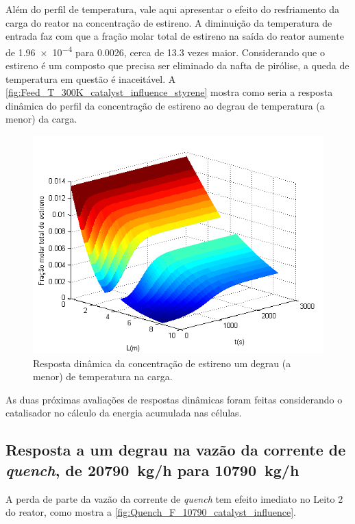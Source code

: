 Além do perfil de temperatura, vale aqui apresentar o efeito do resfriamento da
carga do reator na concentração de estireno. A diminuição da temperatura de
entrada faz com que a fração molar total de estireno na saída do reator aumente
de \num{1,96e-4} para \num{0,0026}, cerca de \num{13,3} vezes maior.
Considerando que o estireno é um composto que precisa ser eliminado da nafta de
pirólise, a queda de temperatura em questão é inaceitável. A
\autoref{fig:Feed_T_300K_catalyst_influence_styrene} mostra como seria a
resposta dinâmica do perfil da concentração de estireno ao degrau de temperatura
(a menor) da carga.

\begin{figure}[htb]
\centering
\includegraphics[scale=0.8]{images/Chap4/Feed_T_300K_catalyst_influence_styrene.png}
\caption{Resposta dinâmica da concentração de estireno um degrau (a menor) de
temperatura na carga.}
\label{fig:Feed_T_300K_catalyst_influence_styrene}
\end{figure}

As duas próximas avaliações de respostas dinâmicas foram feitas considerando o
catalisador no cálculo da energia acumulada nas células.

\subsection{Resposta a um degrau na vazão da corrente de \emph{quench}, de
\SI{20790}{kg/h} para \SI{10790}{kg/h}}
\label{sec:respostaaumdegrauvazao1}

A perda de parte da vazão da corrente de \emph{quench} tem efeito imediato no
Leito 2 do reator, como mostra a \autoref{fig:Quench_F_10790_catalyst_influence}.

